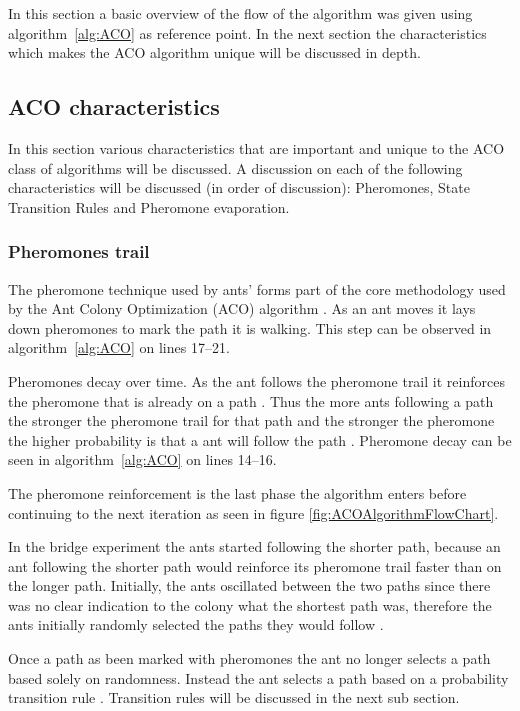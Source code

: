 In this section a basic overview of the flow of the algorithm was given using algorithm~\ref{alg:ACO} as reference point. In the next section the characteristics which makes the ACO algorithm unique will be discussed in depth.
\subsection{ACO characteristics}
\label{sec:ACOcharacter}
In this section various characteristics that are important and unique to the ACO class of algorithms will be discussed. A discussion on each of the following characteristics will be discussed (in order of discussion): Pheromones, State Transition Rules and Pheromone evaporation.
\subsubsection{Pheromones trail}
\label{sec:pheromonetrail}
The pheromone technique used by ants' forms part of the core methodology used by the Ant Colony Optimization (ACO) algorithm \cite{AntQAP}. As an ant moves it lays down pheromones to mark the path it is walking. This step can be observed in algorithm~\ref{alg:ACO} on lines 17--21.

Pheromones decay over time. As the ant follows the pheromone trail it reinforces the pheromone that is already on a path \cite{AntQAP}. Thus the more ants following a path the stronger the pheromone trail for that path and the stronger the pheromone the higher probability is that a ant will follow the path \cite{AntQAP}. Pheromone decay can be seen in algorithm~\ref{alg:ACO} on lines 14--16.

The pheromone reinforcement is the last phase the algorithm enters before continuing to the next iteration as seen in figure \ref{fig:ACOAlgorithmFlowChart}.

In the bridge experiment the ants started following the shorter path, because an ant following the shorter path would reinforce its pheromone trail faster than on the longer path. Initially, the ants oscillated between the two paths since there was no clear indication to the colony what the shortest path was, therefore the ants initially randomly selected the paths they would follow \cite{AntQAP}.

Once a path as been marked with pheromones the ant no longer selects a path based solely on randomness\cite{AntQAP,AntsAndStigmergy,CompuIntelligenceIntro}. Instead the ant selects a path based on a probability transition rule \cite{AntsAndStigmergy}. Transition rules will be discussed in the next sub section.


